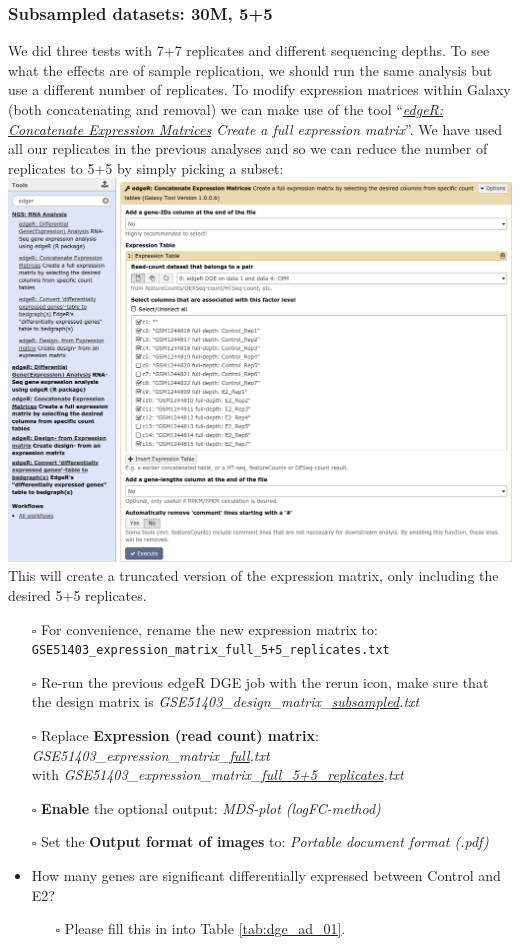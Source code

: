 \subsubsection{Subsampled datasets: 30M, 5+5}
We did three tests with 7+7 replicates and different sequencing depths.
To see what the effects are of sample replication, we should run the same analysis but use a different number of replicates.
To modify expression matrices within Galaxy (both concatenating and removal) we can make use of the tool ``\textit{\underline{edgeR: Concatenate Expression Matrices} Create a full expression matrix}''. We have used all our replicates in the previous analyses and so we can reduce the number of replicates to 5+5 by simply picking a subset:\\
\includegraphics[width=\textwidth]{figures/expression_03.png}\\
This will create a truncated version of the expression matrix, only including the desired 5+5 replicates.
\begin{itemize}
	\item [$\square$] For convenience, rename the new expression matrix to:\\ \verb|GSE51403_expression_matrix_full_5+5_replicates.txt|
	\item [$\square$] Re-run the previous edgeR DGE job with the rerun icon, make sure that the design matrix is \textit{GSE51403\_design\_matrix\_\underline{subsampled}.txt}
	\item [$\square$] Replace \textbf{Expression (read count) matrix}: \textit{GSE51403\_expression\_matrix\_\underline{full}.txt}\\ with \textit{GSE51403\_expression\_matrix\_\underline{full\_5+5\_replicates}.txt}
	\item [$\square$] \textbf{Enable} the optional output: \textit{MDS-plot (logFC-method)}
	\item [$\square$] Set the \textbf{Output format of images} to: \textit{Portable document format (.pdf)}
	\item How many genes are significant differentially expressed between Control and E2?
	\begin{itemize}
		\item[$\square$] Please fill this in into Table \ref{tab:dge_ad_01}.
	\end{itemize}
\end{itemize}
